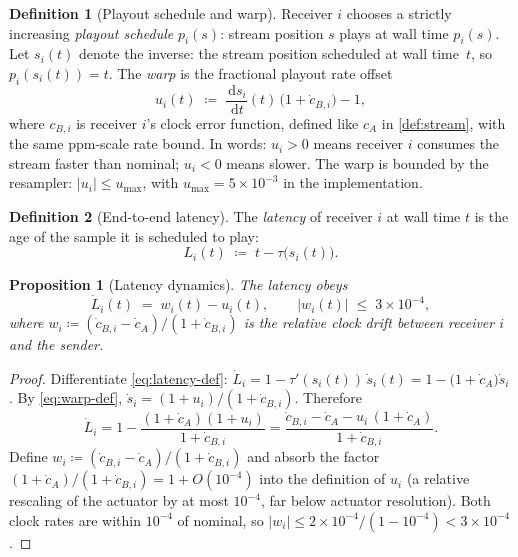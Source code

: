 \documentclass[11pt, a4paper]{article}
\theoremstyle{definition}
\newtheorem{definition}{Definition}[section]
\theoremstyle{plain}
\newtheorem{proposition}[theorem]{Proposition}
\theoremstyle{remark}
\newcommand{\dd}{\,\mathrm{d}}
\begin{document}
\begin{definition}[Playout schedule and warp]\label{def:schedule}
Receiver $i$ chooses a strictly increasing \emph{playout schedule}
$p_i(s)$: stream position $s$ plays at wall time $p_i(s)$.  Let $s_i(t)$
denote the inverse: the stream position scheduled at wall time~$t$, so
$p_i(s_i(t)) = t$.  The \emph{warp} is the fractional playout rate offset
\begin{equation}\label{eq:warp-def}
  u_i(t) \;\coloneqq\; \frac{\dd s_i}{\dd t}(t)\,\bigl(1 + \dot c_{B,i}\bigr) - 1 ,
\end{equation}
where $c_{B,i}$ is receiver $i$'s clock error function, defined like
$c_A$ in \cref{def:stream}, with the same ppm-scale rate bound.  In words: $u_i > 0$ means receiver $i$ consumes the stream faster
than nominal; $u_i < 0$ means slower.  The warp is bounded by the
resampler: $|u_i| \le u_{\max}$, with $u_{\max} = 5\times 10^{-3}$ in the
implementation.
\end{definition}

\begin{definition}[End-to-end latency]\label{def:latency}
The \emph{latency} of receiver $i$ at wall time $t$ is the age of the
sample it is scheduled to play:
\begin{equation}\label{eq:latency-def}
  L_i(t) \;\coloneqq\; t - \tau\!\bigl(s_i(t)\bigr).
\end{equation}
\end{definition}

\begin{proposition}[Latency dynamics]\label{prop:latency-dynamics}
The latency obeys
\begin{equation}\label{eq:latency-dynamics}
  \dot L_i(t) \;=\; w_i(t) - u_i(t),
  \qquad
  |w_i(t)| \;\le\; 3\times 10^{-4},
\end{equation}
where $w_i \coloneqq
(\dot c_{B,i} - \dot c_A)/(1 + \dot c_{B,i})$ is the relative clock
drift between receiver $i$ and the sender.
\end{proposition}

\begin{proof}
Differentiate \cref{eq:latency-def}:
$\dot L_i = 1 - \tau'(s_i(t))\,\dot s_i(t)
          = 1 - \bigl(1+\dot c_A\bigr)\dot s_i$.
By \cref{eq:warp-def}, $\dot s_i = (1+u_i)/(1+\dot c_{B,i})$.  Therefore
\[
  \dot L_i
  = 1 - \frac{(1+\dot c_A)(1+u_i)}{1+\dot c_{B,i}}
  = \frac{\dot c_{B,i} - \dot c_A - u_i\,(1 + \dot c_A)}{1 + \dot c_{B,i}} .
\]
Define $w_i \coloneqq (\dot c_{B,i}-\dot c_A)/(1+\dot c_{B,i})$ and absorb
the factor $(1+\dot c_A)/(1+\dot c_{B,i}) = 1 + O(10^{-4})$ into the
definition of $u_i$ (a relative rescaling of the actuator by at most
$10^{-4}$, far below actuator resolution).  Both clock rates are within
$10^{-4}$ of nominal, so
$|w_i| \le 2\times 10^{-4}/(1 - 10^{-4}) < 3\times 10^{-4}$.
\end{proof}
\end{document}
